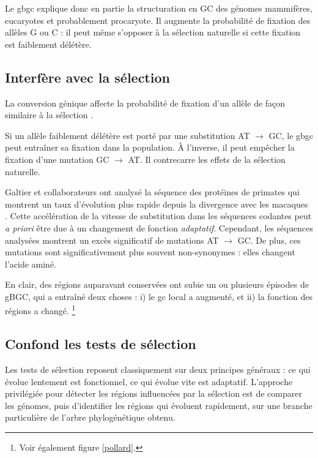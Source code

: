 \documentclass[11pt, oneside]{scrartcl}
\begin{document}
\begin{transition}
  Le \ac{gbgc} explique donc en partie la structuration en GC des génomes
  mammifères, eucaryotes et probablement procaryote. Il augmente la probabilité
  de fixation des allèles G ou C : il peut même s'opposer à la sélection
  naturelle si cette fixation est faiblement délétère.  
\end{transition}


\subsection{Interfère avec la sélection}
\label{sec:orgheadline15}
La conversion génique affecte la probabilité de fixation d'un allèle de façon
similaire à la sélection \cite{nagylaki_evolution_1983}.

Si un allèle faiblement délétère est porté par une substitution AT \(\rightarrow\)
GC, le \ac{gbgc} peut entraîner sa fixation dans la population. À l'inverse, il
peut empêcher la fixation d'une mutation GC \(\rightarrow\) AT. Il contrecarre les
effets de la sélection naturelle.

Galtier et collaborateurs ont analysé la séquence des protéines de primates qui
montrent un taux d'évolution plus rapide depuis la divergence avec les macaques
\cite{galtier_gc-biased_2009}. Cette accélération de la vitesse de substitution
dans les séquences codantes peut \emph{a priori} être due à un changement de fonction
\emph{adaptatif}. Cependant, les séquences analysées montrent un excès significatif
de mutations AT \(\rightarrow\) GC. De plus, ces mutations sont significativement
plus souvent non-synonymes : elles changent l'acide aminé.

En clair, des régions auparavant conservées ont subie un ou plusieurs épisodes
de gBGC, qui a entraîné deux choses : i) le \ac{gc} local a augmenté, et ii) la
fonction des régions a changé. \footnote{Voir également figure \ref{pollard}.}

\subsection{Confond les tests de sélection}
\label{sec:orgheadline16}
Les tests de sélection reposent classiquement sur deux principes généraux
\cite{hurst_genetics_2009} : ce qui évolue lentement est fonctionnel, ce qui
évolue vite est adaptatif. L'approche privilégiée pour détecter les régions
influencées par la sélection est de comparer les génomes, puis d'identifier les
régions qui évoluent rapidement, sur une branche particulière de l'arbre
phylogénétique obtenu\cite{ratnakumar_detecting_2010}.
\end{document}
